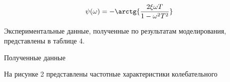 \documentclass[a4paper, 12pt]{article}
\begin{document}
\begin{align}
\psi(\omega) = -\arctg{\frac{2\xi\omega T}{1-\omega^2 T^2}}
\end{align}

\par 
Экспериментальные данные, полученные по результатам моделирования, представлены в таблице 4.

\newpage
\begin{table}[h!]
    \centering
    \begin{threeparttable}
        \caption{Полученные данные} \label{tab:perflogcross}
    \end{threeparttable}
\end{table}

\newpage
\par 
На рисунке 2 представлены частотные характеристики колебательного
\end{document}
